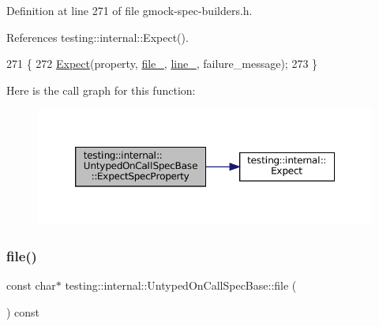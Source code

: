 Definition at line 271 of file gmock-\/spec-\/builders.\+h.



References testing\+::internal\+::\+Expect().


\begin{DoxyCode}
271                                                                               \{
272     \hyperlink{namespacetesting_1_1internal_ab3000fc56be000e4fa6ed7cdcfee3106}{Expect}(property, \hyperlink{classtesting_1_1internal_1_1UntypedOnCallSpecBase_adf4e6c5022dfeb482f5328e9bb58ba88}{file\_}, \hyperlink{classtesting_1_1internal_1_1UntypedOnCallSpecBase_a1dfa0dafaae6697f17adf5d837ca77c7}{line\_}, failure\_message);
273   \}
\end{DoxyCode}
Here is the call graph for this function\+:
\nopagebreak
\begin{figure}[H]
\begin{center}
\leavevmode
\includegraphics[width=350pt]{classtesting_1_1internal_1_1UntypedOnCallSpecBase_a7eeba49b7b2968ebb4859c04684828b2_cgraph}
\end{center}
\end{figure}
\mbox{\label{classtesting_1_1internal_1_1UntypedOnCallSpecBase_a5ccb6ee1208ee597528b44c7c9945fa3}} 
\subsubsection{\texorpdfstring{file()}{file()}}
{\footnotesize\ttfamily const char$\ast$ testing\+::internal\+::\+Untyped\+On\+Call\+Spec\+Base\+::file (\begin{DoxyParamCaption}{ }\end{DoxyParamCaption}) const\hspace{0.3cm}{\ttfamily [inline]}}



